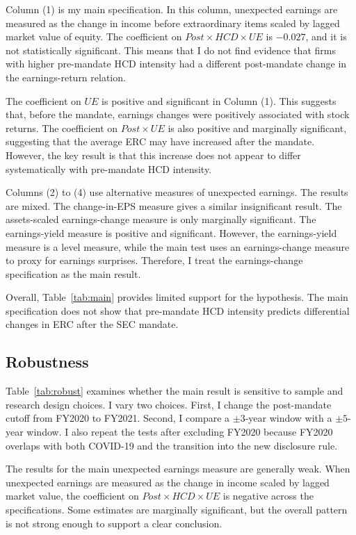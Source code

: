 \documentclass[12pt]{article}
\begin{document}
{Column (1) is my main specification. In this column, unexpected earnings are measured as the change in income before extraordinary items scaled by lagged market value of equity. The coefficient on $Post \times HCD \times UE$ is $-0.027$, and it is not statistically significant. This means that I do not find evidence that firms with higher pre-mandate HCD intensity had a different post-mandate change in the earnings-return relation.

The coefficient on $UE$ is positive and significant in Column (1). This suggests that, before the mandate, earnings changes were positively associated with stock returns. The coefficient on $Post \times UE$ is also positive and marginally significant, suggesting that the average ERC may have increased after the mandate. However, the key result is that this increase does not appear to differ systematically with pre-mandate HCD intensity.

Columns (2) to (4) use alternative measures of unexpected earnings. The results are mixed. The change-in-EPS measure gives a similar insignificant result. The assets-scaled earnings-change measure is only marginally significant. The earnings-yield measure is positive and significant. However, the earnings-yield measure is a level measure, while the main test uses an earnings-change measure to proxy for earnings surprises. Therefore, I treat the earnings-change specification as the main result.

Overall, Table~\ref{tab:main} provides limited support for the hypothesis. The main specification does not show that pre-mandate HCD intensity predicts differential changes in ERC after the SEC mandate.

\subsection{Robustness}

Table~\ref{tab:robust} examines whether the main result is sensitive to sample and research design choices. I vary two choices. First, I change the post-mandate cutoff from FY2020 to FY2021. Second, I compare a $\pm 3$-year window with a $\pm 5$-year window. I also repeat the tests after excluding FY2020 because FY2020 overlaps with both COVID-19 and the transition into the new disclosure rule.

The results for the main unexpected earnings measure are generally weak. When unexpected earnings are measured as the change in income scaled by lagged market value, the coefficient on $Post \times HCD \times UE$ is negative across the specifications. Some estimates are marginally significant, but the overall pattern is not strong enough to support a clear conclusion.

}
\end{document}
